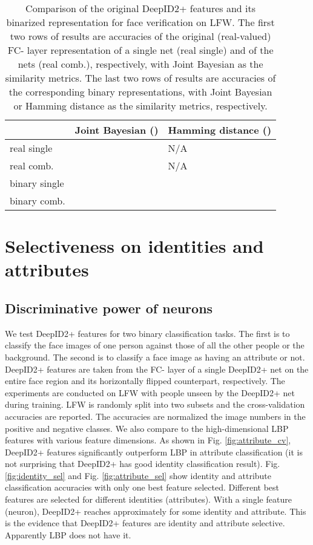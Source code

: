 \documentclass[10pt,twocolumn,letterpaper]{article}
\begin{document}
\begin{table}[t]
\caption{Comparison of the original DeepID2+ features and its binarized representation for face verification on LFW. The first two rows of results are accuracies of the original (real-valued) FC- layer representation of a single net (real single) and of the  nets (real comb.), respectively, with Joint Bayesian as the similarity metrics. The last two rows of results are accuracies of the corresponding binary representations, with Joint Bayesian or Hamming distance as the similarity metrics, respectively.}
\vspace{-0.1in}
\label{tab:sparsity}
\begin{center}
\begin{tabular}{p{60pt}|p{60pt}|p{60pt}}
\toprule
 & Joint Bayesian () & Hamming distance () \\
\midrule
real single &  & N/A \\
real comb. &  & N/A \\
binary single &  &  \\
binary comb. &  &  \\
\bottomrule
\end{tabular}
\end{center}
\vspace{-0.1in}
\end{table}


\section{Selectiveness on identities and attributes}
\label{sec:selectiveness}

\subsection{Discriminative power of neurons}
We test DeepID2+ features for two binary classification tasks. The first is to classify the face images of one person against those of all the other people or the background. The second is to classify a face image as having an attribute or not. DeepID2+ features are taken from the FC- layer of a single DeepID2+ net on the entire face region and its horizontally flipped counterpart, respectively. The experiments are conducted on LFW with people unseen by the DeepID2+ net during training.  LFW is randomly split into two subsets and the cross-validation accuracies are reported. The accuracies are normalized \wrt the image numbers in the positive and negative classes. We also compare to the high-dimensional LBP features \cite{chen2013,cao2013} with various feature dimensions. As shown in Fig. \ref{fig:attribute_cv}, DeepID2+ features significantly outperform LBP in attribute classification (it is not surprising that DeepID2+ has good identity classification result). Fig. \ref{fig:identity_sel} and Fig. \ref{fig:attribute_sel} show identity and attribute classification accuracies with only one best feature selected. Different best features are selected for different identities (attributes). With a single feature (neuron), DeepID2+ reaches approximately  for some identity and attribute. This is the evidence that DeepID2+ features are identity and attribute selective. Apparently LBP does not have it.
\end{document}
